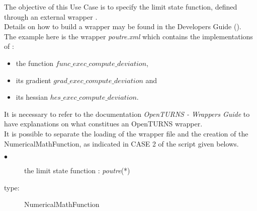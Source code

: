 \renewcommand{\filename}{docUC_LSF_wrapper.tex}
\renewcommand{\filetitle}{UC : From an external wrapper with gradient and hessian implementations}

\HeaderIIILevel




The objective of this Use Case is to specify the limit state function, defined through an external wrapper .\\

Details on how to build a wrapper may be found in the Developers Guide ().\\

The example here is the wrapper {\itshape poutre.xml} which contains the implementations of :
\begin{itemize}
\item the function $func\_exec\_compute\_deviation$,
\item its gradient $grad\_exec\_compute\_deviation$ and
\item its hessian $hes\_exec\_compute\_deviation$.
\end{itemize}
\vspace*{0.5cm}

It is necessary to refer to the documentation {\itshape OpenTURNS - Wrappers Guide} to have explanations on what constitues an OpenTURNS wrapper. \\
It is possible to separate the loading of the wrapper file and the creation of the NumericalMathFunction, as indicated in CASE 2 of the script given belows.

             {
               \begin{description}
               \item[$\bullet$] the limit state function : {\itshape poutre}(*)
               \item[type:]  NumericalMathFunction
               \end{description}
             }

